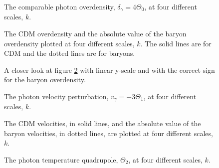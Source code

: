 \documentclass{aa}
\begin{document}


\begin{figure}[h!]
   \caption{The comparable photon overdensity, $\delta_\gamma = 4\Theta_0$, at four different scales, $k$. }\label{fig:delta_gamma}
\end{figure}

\begin{figure}[h!]
   \caption{The CDM overdensity and the absolute value of the baryon overdensity plotted at four different scales, $k$. The solid lines are for CDM and the dotted lines are for baryons.}\label{fig:delta_cdm_delta_b}
\end{figure}

\begin{figure}[h!]
   \caption{A closer look at figure \ref{fig:delta_cdm_delta_b} with linear y-scale and with the correct sign for the baryon overdensity.}\label{fig:delta_cdm_delta_b_zoom}
\end{figure}

\begin{figure}[h!]
   \caption{The photon velocity perturbation, $v_\gamma=-3\Theta_1$, at four different scales, $k$.}\label{fig:v_gamma}
\end{figure}

\begin{figure}[h!]
   \caption{The CDM velocities, in solid lines, and the absolute value of the baryon velocities,
   in dotted lines, are plotted at four different scales, $k$.}\label{fig:v_cdm_v_b}
\end{figure}

\begin{figure}[h!]
   \caption{The photon temperature quadrupole, $\Theta_2$, at four different scales, $k$.}\label{fig:theta2}
\end{figure}
\end{document}

